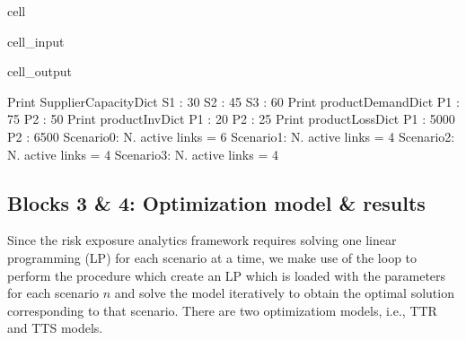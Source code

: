 \documentclass[letterpaper,10pt,english]{jupyterBook}
\begin{document}
\begin{sphinxuseclass}{cell}
\begin{sphinxVerbatimInput}
\begin{sphinxuseclass}{cell_input}
\begin{sphinxVerbatim}[commandchars=\\\{\}]
     
      \PYG{p}{[}\PYG{p}{]}\PYG{p}{[}\PYG{p}{]}
      \PYG{p}{[}\PYG{p}{]}\PYG{p}{[}\PYG{p}{]}
    \PYG{p}{[}\PYG{p}{]}\PYG{p}{[}\PYG{p}{]}  \PYG{p}{[}\PYG{p}{]}\PYG{p}{[}\PYG{p}{]}
\end{sphinxVerbatim}

\end{sphinxuseclass}\end{sphinxVerbatimInput}
\begin{sphinxVerbatimOutput}

\begin{sphinxuseclass}{cell_output}
\begin{sphinxVerbatim}[commandchars=\\\{\}]
Print SupplierCapacityDict
S1  :  30
S2  :  45
S3  :  60
Print productDemandDict
P1  :  75
P2  :  50
Print productInvDict
P1  :  20
P2  :  25
Print productLossDict
P1  :  5000
P2  :  6500
Scenario\PYGZus{}0: N. active links =  6
Scenario\PYGZus{}1: N. active links =  4
Scenario\PYGZus{}2: N. active links =  4
Scenario\PYGZus{}3: N. active links =  4
\end{sphinxVerbatim}

\end{sphinxuseclass}\end{sphinxVerbatimOutput}

\end{sphinxuseclass}

\subsection{Blocks 3 \& 4: Optimization model \& results}
\label{\detokenize{docs/Case3_1_Disruption_Risk_Analytics:blocks-3-4-optimization-model-results}}
\sphinxAtStartPar
Since the risk exposure analytics framework requires solving one linear programming (LP) for each scenario at a time, we make use of the  loop to perform the procedure which create an LP which is loaded with the parameters for each scenario \(n\) and solve the model iteratively to obtain the optimal solution corresponding to that scenario.  There are two optimizatiom models, i.e., TTR and TTS models.
\end{document}
